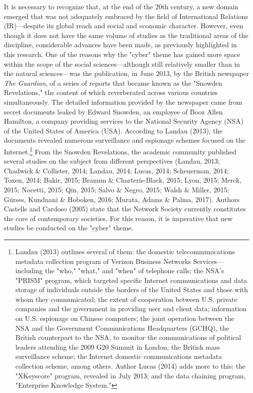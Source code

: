 It is necessary to recognize that, at the end of the 20th century, a new domain emerged that was not adequately embraced by the field of International Relations (IR)—despite its global reach and social and economic character. However, even though it does not have the same volume of studies as the traditional areas of the discipline, considerable advances have been made, as previously highlighted in this research.
One of the reasons why the "cyber" theme has gained more space within the scope of the social sciences—although still relatively smaller than in the natural sciences—was the publication, in June 2013, by the British newspaper \textit{The Guardian}, of a series of reports that became known as the "Snowden Revelations," the content of which reverberated across various countries simultaneously. The detailed information provided by the newspaper came from secret documents leaked by Edward Snowden, an employee of Booz Allen Hamilton, a company providing services to the National Security Agency (NSA) of the United States of America (USA).
According to Landau (2013), the documents revealed numerous surveillance and espionage schemes focused on the Internet.\footnote{Landau (2013) outlines several of them: the domestic telecommunications metadata collection program of Verizon Business Networks Services—including the "who," "what," and "when" of telephone calls; the NSA's "PRISM" program, which targeted specific Internet communications and data storage of individuals outside the borders of the United States and those with whom they communicated; the extent of cooperation between U.S. private companies and the government in providing user and client data; information on U.S. espionage on Chinese computers; the joint operation between the NSA and the Government Communications Headquarters (GCHQ), the British counterpart to the NSA, to monitor the communications of political leaders attending the 2009 G20 Summit in London; the British mass surveillance scheme; the Internet domestic communications metadata collection scheme, among others. Author Lucas (2014) adds more to this: the "XKeyscore" program, revealed in July 2013; and the data chaining program, "Enterprise Knowledge System."}
From the Snowden Revelations, the academic community published several studies on the subject from different perspectives (Landau, 2013; Chadwick \& Collister, 2014; Landau, 2014; Lucas, 2014; Scheuerman, 2014; Toxen, 2014; Bakir, 2015; Branum \& Charteris-Black, 2015; Lyon, 2015; Merck, 2015; Nocetti, 2015; Qin, 2015; Salvo \& Negro, 2015; Walsh \& Miller, 2015; Gürses, Kundnani \& Hoboken, 2016; Murata, Adams \& Palma, 2017). Authors Castells and Cardoso (2005) state that the Network Society currently constitutes the core of contemporary societies. For this reason, it is imperative that new studies be conducted on the "cyber" theme.

